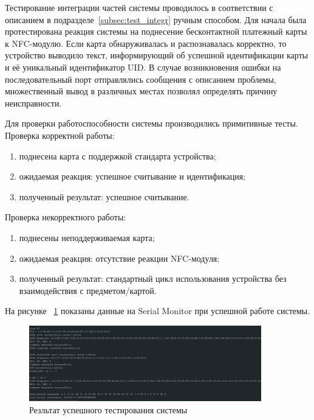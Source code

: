 Тестирование интеграции частей системы проводилось в соответствии с описанием в подразделе~\ref{subsec:test_integr} ручным способом.
Для начала была протестирована реакция системы на поднесение бесконтактной платежный карты к NFC-модулю.
Если карта обнаруживалась и распознавалась корректно, то устройство выводило текст, информирующий об успешной идентификации карты и её уникальный идентификатор UID.
В случае возникновения ошибки на последовательный порт отправлялись сообщения с описанием проблемы, множественный вывод в различных местах позволял определять причину неисправности.

Для проверки работоспособности системы производились примитивные тесты.
Проверка корректной работы:
\begin{enumerate}
    \item поднесена карта с поддержкой стандарта устройства;
    \item ожидаемая реакция: успешное считывание и идентификация;
    \item полученный результат: успешное считывание.
\end{enumerate}

Проверка некорректного работы:
\begin{enumerate}
    \item поднесены неподдерживаемая карта;
    \item ожидаемая реакция: отсутствие реакции NFC-модуля;
    \item полученный результат: стандартный цикл использования устройства без взаимодействия с предметом/картой.
\end{enumerate}

На рисунке ~\ref{fig:test_success} показаны данные на Serial Monitor при успешной работе системы.

\begin{figure}[H]
    \centering
    \includegraphics[width=0.9\textwidth]{images/design/test_success}
    \caption{\centering Резльтат успешного тестирования системы}
    \label{fig:test_success}
\end{figure}
